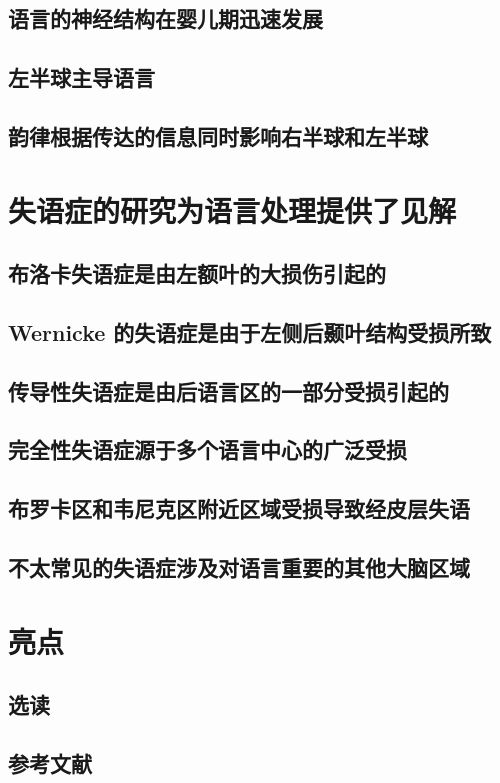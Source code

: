 \subsection{语言的神经结构在婴儿期迅速发展}
\subsection{左半球主导语言}
\subsection{韵律根据传达的信息同时影响右半球和左半球}

\section{失语症的研究为语言处理提供了见解}
\subsection{布洛卡失语症是由左额叶的大损伤引起的}
\subsection{Wernicke 的失语症是由于左侧后颞叶结构受损所致}
\subsection{传导性失语症是由后语言区的一部分受损引起的}
\subsection{完全性失语症源于多个语言中心的广泛受损}
\subsection{布罗卡区和韦尼克区附近区域受损导致经皮层失语}
\subsection{不太常见的失语症涉及对语言重要的其他大脑区域}

\section{亮点}
\subsection{选读}
\subsection{参考文献}

